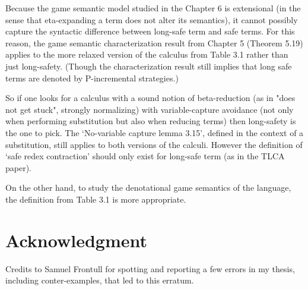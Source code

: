 \documentclass[11pt]{article}
\begin{document}
\begin{itemize}
Because the game semantic model studied in the Chapter 6 is extensional (in the sense that eta-expanding a term does not alter its semantics), 
it cannot possibly capture the syntactic difference between long-safe term and safe terms. 
For this reason, the game semantic characterization result from Chapter 5 (Theorem 5.19) applies to the more relaxed version of 
the calculus from Table 3.1 rather than just long-safety.
(Though the characterization result still implies that long safe terms are denoted by P-incremental strategies.) 

So if one looks for a calculus with a sound notion of beta-reduction (as in "does not get stuck", strongly normalizing) with variable-capture avoidance 
(not only when performing substitution but also when reducing terms) then long-safety is the one to pick.
The `No-variable capture lemma 3.15', defined in the context of a substitution, still applies to both versions of the calculi.
However the definition of `safe redex contraction' should only exist for long-safe term (as in the TLCA paper).

On the other hand, to study the denotational game semantics of the language, the definition from Table 3.1 is more appropriate.

\end{itemize}

\section{Acknowledgment}
Credits to Samuel Frontull for spotting and reporting a few errors in my thesis, including conter-examples, that led to this erratum.
\end{document}
